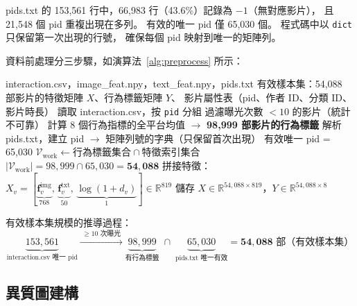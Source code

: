 \documentclass[12pt, a4paper]{article}
\begin{document}
\begin{warnbox2}
pids.txt 的 153,561 行中，66,983 行（43.6\%）記錄為 $-1$（無對應影片），
且 21,548 個 pid 重複出現在多列。
有效的唯一 pid 僅 65,030 個。
程式碼中以 \texttt{dict} 只保留第一次出現的行號，
確保每個 pid 映射到唯一的矩陣列。
\end{warnbox2}

資料前處理分三步驟，如演算法~\ref{alg:preprocess} 所示：

\begin{algorithm}[H]
\caption{資料前處理}
\label{alg:preprocess}
\begin{algorithmic}[1]
\Require interaction.csv，image\_feat.npy，text\_feat.npy，pids.txt
\Ensure 有效樣本集：54,088 部影片的特徵矩陣 $X$、行為標籤矩陣 $Y$、
        影片屬性表（pid、作者 ID、分類 ID、影片時長）
\State 讀取 interaction.csv，按 \texttt{pid} 分組
\State 過濾曝光次數 $< 10$ 的影片（統計不可靠）
\State 計算 8 個行為指標的全平台均值
  $\rightarrow$ \textbf{98,999 部影片的行為標籤}
\State 解析 pids.txt，建立 pid $\to$ 矩陣列號的字典（只保留首次出現）
\State 有效唯一 pid = 65,030
\State $\mathcal{V}_{\mathrm{work}} \leftarrow \text{行為標籤集合} \cap \text{特徵索引集合}$
\State $|\mathcal{V}_{\mathrm{work}}| = 98{,}999 \cap 65{,}030 = \mathbf{54{,}088}$
\State 拼接特徵：$X_v = [\underbrace{\mathbf{f}_v^{\mathrm{img}}}_{768},\,
                          \underbrace{\mathbf{f}_v^{\mathrm{txt}}}_{50},\,
                          \underbrace{\log(1+d_v)}_{1}] \in \mathbb{R}^{819}$
\State 儲存 $X \in \mathbb{R}^{54{,}088\times819}$，$Y \in \mathbb{R}^{54{,}088\times8}$
\end{algorithmic}
\end{algorithm}

有效樣本集規模的推導過程：
\begin{equation}
  \underbrace{153{,}561}_{\text{interaction.csv 唯一 pid}}
  \xrightarrow{\;\geq 10\text{ 次曝光}\;}
  \underbrace{98{,}999}_{\text{有行為標籤}}
  \;\cap\;
  \underbrace{65{,}030}_{\text{pids.txt 唯一有效}}
  = \mathbf{54{,}088} \text{ 部（有效樣本集）}
\end{equation}

\subsection{異質圖建構}
\end{document}

